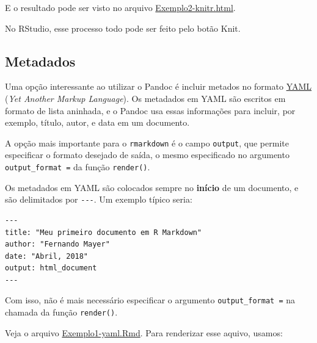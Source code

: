 \documentclass[
  10pt,
  a4paper]{book}
\begin{document}
E o resultado pode ser visto no arquivo
\href{exemplos/Exemplo2-knitr.html}{Exemplo2-knitr.html}.

No RStudio, esse processo todo pode ser feito pelo botão
Knit.

\hypertarget{metadados}{%
\subsection{Metadados}\label{metadados}}

Uma opção interessante ao utilizar o Pandoc é incluir metados no formato
\href{http://yaml.org/}{YAML} (\emph{Yet Another Markup Language}). Os metadados em YAML são
escritos em formato de lista aninhada, e o Pandoc usa essas informações
para incluir, por exemplo, título, autor, e data em um documento.

A opção mais importante para o \texttt{rmarkdown} é o campo \texttt{output}, que
permite especificar o formato desejado de saída, o mesmo especificado no
argumento \texttt{output\_format\ =} da função \texttt{render()}.

Os metadados em YAML são colocados sempre no \textbf{início} de um documento,
e são delimitados por \texttt{-\/-\/-}. Um exemplo típico seria:

\begin{verbatim}
---
title: "Meu primeiro documento em R Markdown"
author: "Fernando Mayer"
date: "Abril, 2018"
output: html_document
---
\end{verbatim}

Com isso, não é mais necessário especificar o argumento \texttt{output\_format\ =} na chamada da função \texttt{render()}.

Veja o arquivo \href{exemplos/Exemplo1-yaml.Rmd}{Exemplo1-yaml.Rmd}. Para
renderizar esse aquivo, usamos:
\end{document}
